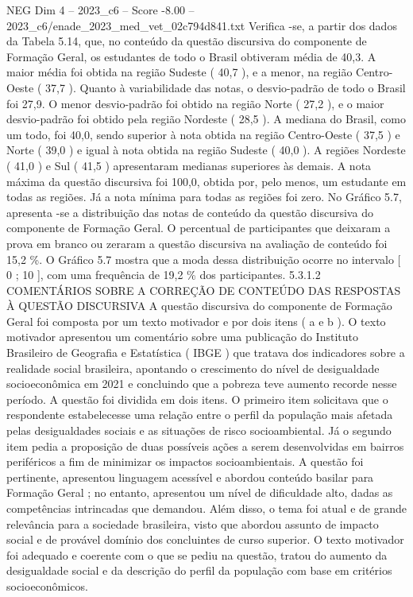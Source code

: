 \begin{textsample}{NEG Dim 4 – 2023\_c6 – Score -8.00 – 2023\_c6/enade\_2023\_med\_vet\_02c794d841.txt}
Verifica -se, a partir dos dados da Tabela 5.14, que, no conteúdo da questão discursiva do componente de Formação Geral, os estudantes de todo o Brasil obtiveram média de 40,3.
A maior média foi obtida na região Sudeste ( 40,7 ), e a menor, na região Centro-Oeste ( 37,7 ).
Quanto à variabilidade das notas, o desvio-padrão de todo o Brasil foi 27,9.
O menor desvio-padrão foi obtido na região Norte ( 27,2 ), e o maior desvio-padrão foi obtido pela região Nordeste ( 28,5 ).
A mediana do Brasil, como um todo, foi 40,0, sendo superior à nota obtida na região Centro-Oeste ( 37,5 ) e Norte ( 39,0 ) e igual à nota obtida na região Sudeste ( 40,0 ).
A regiões Nordeste ( 41,0 ) e Sul ( 41,5 ) apresentaram medianas superiores às demais.
A nota máxima da questão discursiva foi 100,0, obtida por, pelo menos, um estudante em todas as regiões.
Já a nota mínima para todas as regiões foi zero.
No Gráfico 5.7, apresenta -se a distribuição das notas de conteúdo da questão discursiva do componente de Formação Geral.
O percentual de participantes que deixaram a prova em branco ou zeraram a questão discursiva na avaliação de conteúdo foi 15,2 \%.
O Gráfico 5.7 mostra que a moda dessa distribuição ocorre no intervalo [ 0 ; 10 ], com uma frequência de 19,2 \% dos participantes. 5.3.1.2 COMENTÁRIOS SOBRE A CORREÇÃO DE CONTEÚDO DAS RESPOSTAS À QUESTÃO DISCURSIVA A questão discursiva do componente de Formação Geral foi composta por um texto motivador e por dois itens ( a e b ).
O texto motivador apresentou um comentário sobre uma publicação do Instituto Brasileiro de Geografia e Estatística ( IBGE ) que tratava dos indicadores sobre a realidade social brasileira, apontando o crescimento do nível de desigualdade socioeconômica em 2021 e concluindo que a pobreza teve aumento recorde nesse período.
A questão foi dividida em dois itens.
O primeiro item solicitava que o respondente estabelecesse uma relação entre o perfil da população mais afetada pelas desigualdades sociais e as situações de risco socioambiental.
Já o segundo item pedia a proposição de duas possíveis ações a serem desenvolvidas em bairros periféricos a fim de minimizar os impactos socioambientais.
A questão foi pertinente, apresentou linguagem acessível e abordou conteúdo basilar para Formação Geral ; no entanto, apresentou um nível de dificuldade alto, dadas as competências intrincadas que demandou.
Além disso, o tema foi atual e de grande relevância para a sociedade brasileira, visto que abordou assunto de impacto social e de provável domínio dos concluintes de curso superior.
O texto motivador foi adequado e coerente com o que se pediu na questão, tratou do aumento da desigualdade social e da descrição do perfil da população com base em critérios socioeconômicos.

\end{textsample}
